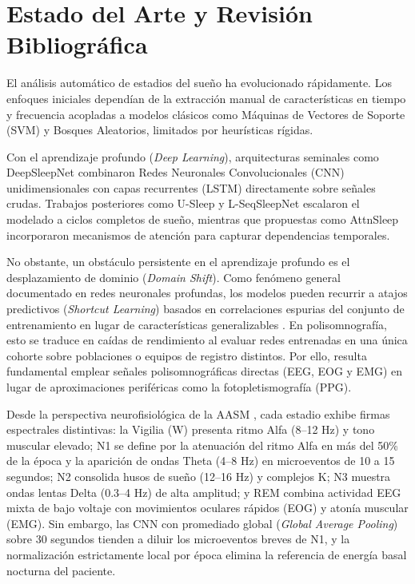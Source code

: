 \documentclass[conference]{IEEEtran}
\begin{document}
\section{Estado del Arte y Revisión Bibliográfica}
El análisis automático de estadios del sueño ha evolucionado rápidamente. Los enfoques iniciales dependían de la extracción manual de características en tiempo y frecuencia acopladas a modelos clásicos como Máquinas de Vectores de Soporte (SVM) y Bosques Aleatorios, limitados por heurísticas rígidas.

Con el aprendizaje profundo (\textit{Deep Learning}), arquitecturas seminales como DeepSleepNet \cite{supratak2017} combinaron Redes Neuronales Convolucionales (CNN) unidimensionales con capas recurrentes (LSTM) directamente sobre señales crudas. Trabajos posteriores como U-Sleep \cite{perslev2021} y L-SeqSleepNet \cite{phan2023} escalaron el modelado a ciclos completos de sueño, mientras que propuestas como AttnSleep \cite{eldele2021} incorporaron mecanismos de atención para capturar dependencias temporales.

No obstante, un obstáculo persistente en el aprendizaje profundo es el desplazamiento de dominio (\textit{Domain Shift}). Como fenómeno general documentado en redes neuronales profundas, los modelos pueden recurrir a atajos predictivos (\textit{Shortcut Learning}) basados en correlaciones espurias del conjunto de entrenamiento en lugar de características generalizables \cite{geirhos2020shortcut}. En polisomnografía, esto se traduce en caídas de rendimiento al evaluar redes entrenadas en una única cohorte sobre poblaciones o equipos de registro distintos. Por ello, resulta fundamental emplear señales polisomnográficas directas (EEG, EOG y EMG) en lugar de aproximaciones periféricas como la fotopletismografía (PPG).

Desde la perspectiva neurofisiológica de la AASM \cite{berry2020}, cada estadio exhibe firmas espectrales distintivas: la Vigilia (W) presenta ritmo Alfa (8--12 Hz) y tono muscular elevado; N1 se define por la atenuación del ritmo Alfa en más del 50\% de la época y la aparición de ondas Theta (4--8 Hz) en microeventos de 10 a 15 segundos; N2 consolida husos de sueño (12--16 Hz) y complejos K; N3 muestra ondas lentas Delta (0.3--4 Hz) de alta amplitud; y REM combina actividad EEG mixta de bajo voltaje con movimientos oculares rápidos (EOG) y atonía muscular (EMG). Sin embargo, las CNN con promediado global (\textit{Global Average Pooling}) sobre 30 segundos tienden a diluir los microeventos breves de N1, y la normalización estrictamente local por época elimina la referencia de energía basal nocturna del paciente.
\end{document}
